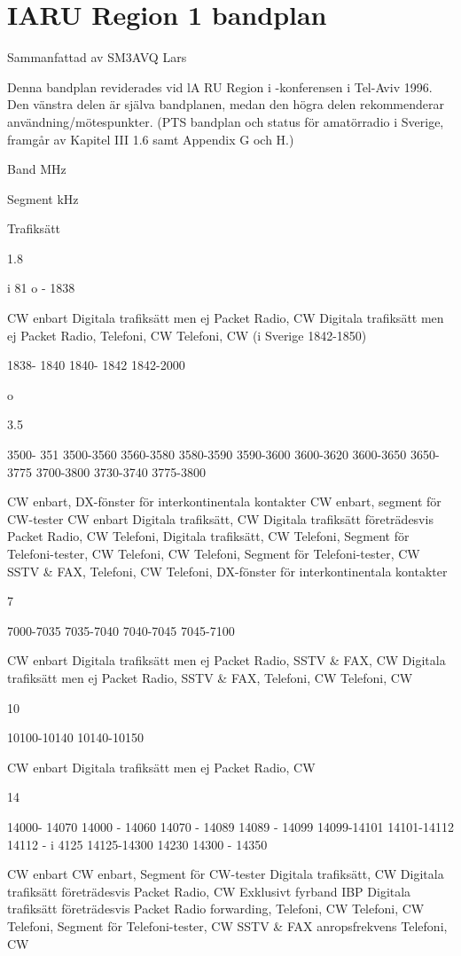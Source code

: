 \chapter{IARU Region 1 bandplan}

Sammanfattad av SM3AVQ Lars

Denna bandplan reviderades vid lA RU Region i -konferensen i Tel-Aviv 1996.
Den vänstra delen är själva bandplanen, medan den högra delen rekommenderar användning/mötespunkter.
(PTS bandplan och status för amatörradio i Sverige, framgår av Kapitel III 1.6 samt Appendix G och H.)

Band
MHz

Segment
kHz

Trafiksätt

1.8

i 81 o - 1838

CW enbart
Digitala trafiksätt men ej Packet Radio, CW
Digitala trafiksätt men ej Packet Radio, Telefoni, CW
Telefoni, CW
(i Sverige 1842-1850)

1838- 1840
1840- 1842
1842-2000

o

3.5

3500- 351
3500-3560
3560-3580
3580-3590
3590-3600
3600-3620
3600-3650
3650-3775
3700-3800
3730-3740
3775-3800

CW enbart, DX-fönster för interkontinentala kontakter
CW enbart, segment för CW-tester
CW enbart
Digitala trafiksätt, CW
Digitala trafiksätt företrädesvis Packet Radio, CW
Telefoni, Digitala trafiksätt, CW
Telefoni, Segment för Telefoni-tester, CW
Telefoni, CW
Telefoni, Segment för Telefoni-tester, CW
SSTV \& FAX, Telefoni, CW
Telefoni, DX-fönster för interkontinentala kontakter

7

7000-7035
7035-7040
7040-7045
7045-7100

CW enbart
Digitala trafiksätt men ej Packet Radio, SSTV \& FAX, CW
Digitala trafiksätt men ej Packet Radio, SSTV \& FAX, Telefoni, CW
Telefoni, CW

10

10100-10140
10140-10150

CW enbart
Digitala trafiksätt men ej Packet Radio, CW

14

14000- 14070
14000 - 14060
14070 - 14089
14089 - 14099
14099-14101
14101-14112
14112 - i 4125
14125-14300
14230
14300 - 14350

CW enbart
CW enbart, Segment för CW-tester
Digitala trafiksätt, CW
Digitala trafiksätt företrädesvis Packet Radio, CW
Exklusivt fyrband IBP
Digitala trafiksätt företrädesvis Packet Radio forwarding, Telefoni, CW
Telefoni, CW
Telefoni, Segment för Telefoni-tester, CW
SSTV \& FAX anropsfrekvens
Telefoni, CW

